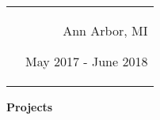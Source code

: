 \documentclass[9pt]{memoir}
\begin{document}
\begin{itemize}
\begin{tabular}[t]{lr}
\begin{minipage}[t]{0.7 \textwidth}
\end{minipage}

&

\begin{minipage}[t]{0.2 \textwidth}
\raggedleft

\normalsize
Ann Arbor, MI

\small
May 2017 - June 2018
\end{minipage}

\\

\end{tabular}
\end{itemize}

\begin{mdframed}
\textbf{Projects}
\end{mdframed}

\begin{itemize}
    \small


\end{itemize}
\end{document}
